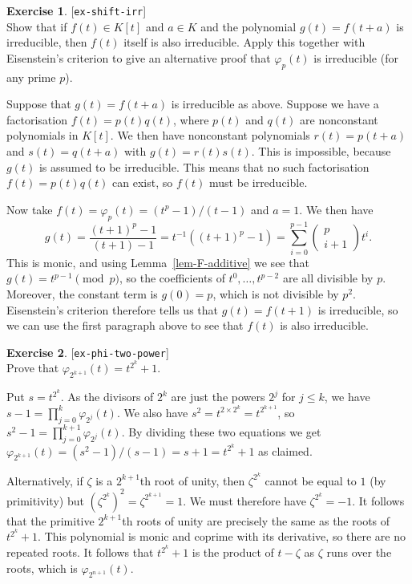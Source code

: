 \documentclass{amsart}
\newcommand{\zt}        {\zeta}
\newcommand{\vph}       {\varphi}
\newcommand{\tm}        {\times}
\newcommand{\bcf}[2]{\left(\begin{array}{c}{#1}\\{#2}\end{array}\right)}
\renewcommand{\:}{\colon}
\newcommand{\lastexlabel}{}
\newcommand{\exlabel}[1]{
 \global\def\lastexlabel{#1}\label{#1}[\texttt{#1}]\ \\
}
\newcommand{\exlabel}[1]{
 \global\def\lastexlabel{#1}\label{#1}
}
\newenvironment{solution}{\SolutionInline}{\endSolutionInline}
\theoremstyle{definition}
\newtheorem{exercise}{Exercise}[section]
\renewenvironment{solution}{\SolutionAtEnd}{\endSolutionAtEnd}
\begin{document}
\begin{exercise}\exlabel{ex-shift-irr}
 Show that if $f(t)\in K[t]$ and $a\in K$ and the polynomial
 $g(t)=f(t+a)$ is irreducible, then $f(t)$ itself is also
 irreducible.  Apply this together with Eisenstein's criterion to give
 an alternative proof that $\vph_p(t)$ is irreducible (for any prime
 $p$).  
\end{exercise}
\begin{solution}
 Suppose that $g(t)=f(t+a)$ is irreducible as above.  Suppose we have
 a factorisation $f(t)=p(t)q(t)$, where $p(t)$ and $q(t)$ are
 nonconstant polynomials in $K[t]$.  We then have nonconstant
 polynomials $r(t)=p(t+a)$ and $s(t)=q(t+a)$ with $g(t)=r(t)s(t)$.
 This is impossible, because $g(t)$ is assumed to be irreducible.
 This means that no such factorisation $f(t)=p(t)q(t)$ can exist, so
 $f(t)$ must be irreducible.

 Now take $f(t)=\vph_p(t)=(t^p-1)/(t-1)$ and $a=1$.  We then have 
 \[ g(t) = \frac{(t+1)^p-1}{(t+1)-1} = 
     t^{-1}((t+1)^p-1) = \sum_{i=0}^{p-1}\bcf{p}{i+1}t^i.
 \]
 This is monic, and using Lemma~\ref{lem-F-additive} we see that
 $g(t)=t^{p-1}\pmod{p}$, so the coefficients of $t^0,\dotsc,t^{p-2}$
 are all divisible by $p$.  Moreover, the constant term is $g(0)=p$,
 which is not divisible by $p^2$.  Eisenstein's criterion therefore
 tells us that $g(t)=f(t+1)$ is irreducible, so we can use the first
 paragraph above to see that $f(t)$ is also irreducible.
\end{solution}
\begin{exercise}\exlabel{ex-phi-two-power}
 Prove that $\vph_{2^{k+1}}(t)=t^{2^k}+1$. 
\end{exercise}
\begin{solution}
 Put $s=t^{2^k}$.  As the divisors of $2^k$ are just the powers $2^j$
 for $j\leq k$, we have $s-1=\prod_{j=0}^k\vph_{2^j}(t)$.  We also
 have $s^2=t^{2\tm 2^k}=t^{2^{k+1}}$, so
 $s^2-1=\prod_{j=0}^{k+1}\vph_{2^j}(t)$.  By dividing these two
 equations we get $\vph_{2^{k+1}}(t)=(s^2-1)/(s-1)=s+1=t^{2^k}+1$ as
 claimed. 

 Alternatively, if $\zt$ is a $2^{k+1}$th root of unity, then
 $\zt^{2^k}$ cannot be equal to $1$ (by primitivity) but
 $(\zt^{2^k})^2=\zt^{2^{k+1}}=1$.  We must therefore have
 $\zt^{2^k}=-1$.  It follows that the primitive $2^{k+1}$th roots of
 unity are precisely the same as the roots of $t^{2^k}+1$.  This
 polynomial is monic and coprime with its derivative, so there are no
 repeated roots.  It follows that $t^{2^k}+1$ is the product of
 $t-\zt$ as $\zt$ runs over the roots, which is $\vph_{2^{n+1}}(t)$.
\end{solution}
\end{document}
